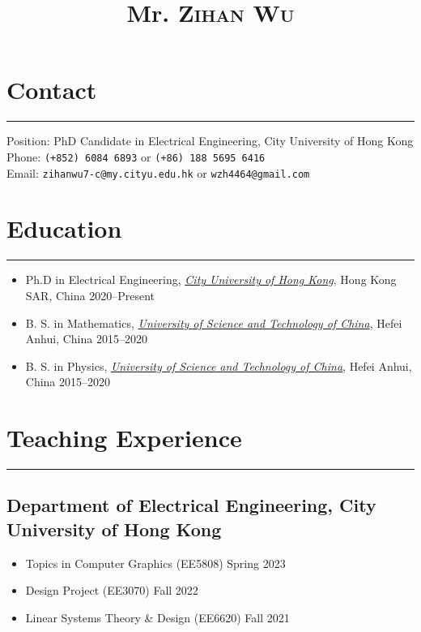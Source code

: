 \documentclass{article}
\title{Mr. \scshape Zihan Wu}
\author{}
\date{}
\newcommand{\cussection}[1]{\vspace{--0.05in}\section*{#1}\vspace{--0.1in} \hrule\vspace{0.2in} }
\begin{document}
\maketitle
\thispagestyle{empty}
\vspace{-0.5in}

\cussection{Contact} 
Position: PhD Candidate in Electrical Engineering, City University of Hong Kong\\
Phone: \texttt{(+852) 6084 6893} or \texttt{(+86) 188 5695 6416} \\ %
Email: \texttt{zihanwu7-c@my.cityu.edu.hk} or \texttt{wzh4464@gmail.com}
\cussection{Education}
\begin{itemize}
    \item Ph.D in Electrical Engineering, \href{https://www.cityu.edu.hk/}{\emph{City University of Hong Kong}}, Hong Kong SAR, China \hfill 2020--Present
    \item B. S. in Mathematics, \href{https://en.ustc.edu.cn/}{\emph{University of Science and Technology of China}}, Hefei Anhui, China \hfill{2015--2020}
    \item B. S. in Physics, \href{https://en.ustc.edu.cn/}{\emph{University of Science and Technology of China}}, Hefei Anhui, China \hfill{2015--2020}
\end{itemize}




\cussection{Teaching Experience}

\subsection*{Department of Electrical Engineering, City University of Hong Kong}

\begin{itemize}
    \item Topics in Computer Graphics (EE5808) \hfill Spring 2023
    \item Design Project (EE3070) \hfill Fall 2022
    \item Linear Systems Theory \& Design (EE6620) \hfill Fall 2021
\end{itemize}
\end{document}
